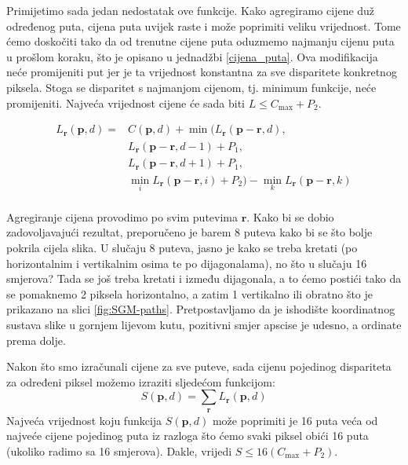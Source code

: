 \documentclass[utf8, zavrsni, numeric]{fer}
\begin{document}
Primijetimo sada jedan nedostatak ove funkcije. Kako agregiramo cijene duž određenog puta, cijena puta uvijek raste i može poprimiti veliku vrijednost. Tome ćemo doskočiti tako da od trenutne cijene puta oduzmemo najmanju cijenu puta u prošlom koraku, što je opisano u jednadžbi \ref{cijena_puta}.
Ova modifikacija neće promijeniti put jer je ta vrijednost konstantna za sve disparitete konkretnog piksela. Stoga se disparitet s najmanjom cijenom, tj. minimum funkcije, neće promijeniti.
Najveća vrijednost cijene će sada biti $L \leq C_{\max} + P_2$.

\begin{equation} \label{cijena_puta}
  \begin{split}
    L_{\mathbf{r}}(\mathbf{p}, d) = & C(\mathbf{p}, d) + \min(L_{\mathbf{r}}(\mathbf{p} - \mathbf{r}, d), \\
    & L_{\mathbf{r}}(\mathbf{p} - \mathbf{r}, d - 1) + P_1, \\
    & L_{\mathbf{r}}(\mathbf{p} - \mathbf{r}, d + 1) + P_1, \\
    & \min\limits_{i} L_{\mathbf{r}}(\mathbf{p} - \mathbf{r}, i) + P_2) - \min\limits_{k}L_{\mathbf{r}}(\mathbf{p} - \mathbf{r}, k) \\
  \end{split}
\end{equation}

Agregiranje cijena provodimo po svim putevima $\mathbf{r}$. Kako bi se dobio zadovoljavajući rezultat,
preporučeno je barem 8 puteva kako bi se što bolje pokrila cijela slika. U slučaju 8 puteva, jasno je kako se treba kretati (po horizontalnim i vertikalnim osima te po dijagonalama), no što u slučaju 16 smjerova?
Tada se još treba kretati i između dijagonala, a to ćemo postići tako da se pomaknemo 2 piksela horizontalno, a zatim 1 vertikalno ili obratno što je prikazano na slici \ref{fig:SGM-paths}. Pretpostavljamo da je ishodište koordinatnog sustava slike u gornjem lijevom kutu, pozitivni smjer apscise je udesno, a ordinate prema dolje.

Nakon što smo izračunali cijene za sve puteve, sada cijenu pojedinog dispariteta za određeni
piksel možemo izraziti sljedećom funkcijom:
\begin{equation}
  S(\mathbf{p}, d) = \sum_{\mathbf{r}}L_{\mathbf{r}}(\mathbf{p}, d)
\end{equation}
Najveća vrijednost koju funkcija $S(\mathbf{p}, d)$ može poprimiti je 16 puta veća od najveće cijene pojedinog puta iz razloga što
ćemo svaki piksel obići 16 puta (ukoliko radimo sa 16 smjerova). Dakle, vrijedi $S \leq 16(C_{\max} + P_2)$.
\end{document}

